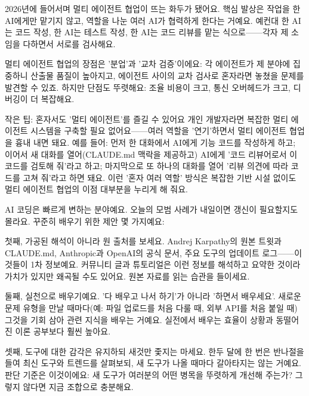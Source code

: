 
2026년에 들어서며 멀티 에이전트 협업이 뜨는 화두가 됐어요. 핵심 발상은 작업을 한 AI에게만 맡기지 않고, 역할을 나눈 여러 AI가 협력하게 한다는 거예요. 예컨대 한 AI는 코드 작성, 한 AI는 테스트 작성, 한 AI는 코드 리뷰를 맡는 식으로——각자 제 소임을 다하면서 서로를 검사해요.

멀티 에이전트 협업의 장점은 '분업'과 '교차 검증'이에요: 각 에이전트가 제 분야에 집중하니 산출물 품질이 높아지고, 에이전트 사이의 교차 검사로 혼자라면 놓쳤을 문제를 발견할 수 있죠. 하지만 단점도 뚜렷해요: 조율 비용이 크고, 통신 오버헤드가 크고, 디버깅이 더 복잡해요.

\begin{tcbinfo}{작은 팁: 혼자서도 '멀티 에이전트'를 즐길 수 있어요}
개인 개발자라면 복잡한 멀티 에이전트 시스템을 구축할 필요 없어요——여러 역할을 '연기'하면서 멀티 에이전트 협업을 흉내 내면 돼요. 예를 들어: 먼저 한 대화에서 AI에게 기능 코드를 작성하게 하고; 이어서 새 대화를 열어(CLAUDE.md 맥락을 제공하고) AI에게 '코드 리뷰어로서 이 코드를 검토해 줘'라고 하고; 마지막으로 또 하나의 대화를 열어 '리뷰 의견에 따라 코드를 고쳐 줘'라고 하면 돼요. 이런 '혼자 여러 역할' 방식은 복잡한 기반 시설 없이도 멀티 에이전트 협업의 이점 대부분을 누리게 해 줘요.

\end{tcbinfo}


AI 코딩은 빠르게 변하는 분야예요. 오늘의 모범 사례가 내일이면 갱신이 필요할지도 몰라요. 꾸준히 배우기 위한 제안 몇 가지예요:

첫째, 가공된 해석이 아니라 원 출처를 보세요. Andrej Karpathy의 원본 트윗과 CLAUDE.md, Anthropic과 OpenAI의 공식 문서, 주요 도구의 업데이트 로그——이것들이 1차 정보예요. 커뮤니티 글과 튜토리얼은 이런 정보를 해석하고 요약한 것이라 가치가 있지만 왜곡될 수도 있어요. 원본 자료를 읽는 습관을 들이세요.

둘째, 실천으로 배우기예요. '다 배우고 나서 하기'가 아니라 '하면서 배우세요'. 새로운 문제 유형을 만날 때마다(예: 파일 업로드를 처음 다룰 때, 외부 API를 처음 붙일 때) 그것을 기회 삼아 관련 지식을 배우는 거예요. 실전에서 배우는 효율이 상황과 동떨어진 이론 공부보다 훨씬 높아요.

셋째, 도구에 대한 감각은 유지하되 새것만 좇지는 마세요. 한두 달에 한 번은 반나절을 들여 최신 도구와 트렌드를 살펴보되, 새 도구가 나올 때마다 갈아타지는 않는 거예요. 판단 기준은 이것이에요: 새 도구가 여러분의 어떤 병목을 뚜렷하게 개선해 주는가? 그렇지 않다면 지금 조합으로 충분해요.

